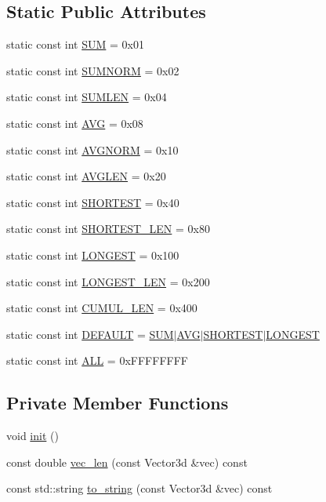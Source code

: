 \subsection*{Static Public Attributes}
\begin{CompactItemize}
\item 
static const int \hyperlink{class_vec_set_stats_d40b4c031735e61869d380bec761041a}{SUM} = 0x01
\item 
static const int \hyperlink{class_vec_set_stats_5c6b167522f05f04d0357f9c525404ed}{SUMNORM} = 0x02
\item 
static const int \hyperlink{class_vec_set_stats_1a5991a18254611aec6ea124f916b650}{SUMLEN} = 0x04
\item 
static const int \hyperlink{class_vec_set_stats_8d4885dfc7b4e4d631e12b1031dabfa8}{AVG} = 0x08
\item 
static const int \hyperlink{class_vec_set_stats_0972452644e7552d3de11d9763f04d13}{AVGNORM} = 0x10
\item 
static const int \hyperlink{class_vec_set_stats_6d85082797085df8918a799163244e20}{AVGLEN} = 0x20
\item 
static const int \hyperlink{class_vec_set_stats_5ec901fadff91737ffd16ca3d89e08f2}{SHORTEST} = 0x40
\item 
static const int \hyperlink{class_vec_set_stats_3023bfabad5006b6dce50482725a2319}{SHORTEST\_\-LEN} = 0x80
\item 
static const int \hyperlink{class_vec_set_stats_0be7215a7373552c5fabd78881735003}{LONGEST} = 0x100
\item 
static const int \hyperlink{class_vec_set_stats_6fcd640961e61b328785f8c030e30181}{LONGEST\_\-LEN} = 0x200
\item 
static const int \hyperlink{class_vec_set_stats_8fe79d213b693917d14bcacd86ff62aa}{CUMUL\_\-LEN} = 0x400
\item 
static const int \hyperlink{class_vec_set_stats_dd7f69167d67da63e03c36f57335c92c}{DEFAULT} = \hyperlink{class_vec_set_stats_d40b4c031735e61869d380bec761041a}{SUM}$|$\hyperlink{class_vec_set_stats_8d4885dfc7b4e4d631e12b1031dabfa8}{AVG}$|$\hyperlink{class_vec_set_stats_5ec901fadff91737ffd16ca3d89e08f2}{SHORTEST}$|$\hyperlink{class_vec_set_stats_0be7215a7373552c5fabd78881735003}{LONGEST}
\item 
static const int \hyperlink{class_vec_set_stats_b56c7865a2064a85a8e46d6add9bda9f}{ALL} = 0xFFFFFFFF
\end{CompactItemize}
\subsection*{Private Member Functions}
\begin{CompactItemize}
\item 
void \hyperlink{class_vec_set_stats_37fbc88237b5eb4d2ec81656bbf2ecc1}{init} ()
\item 
const double \hyperlink{class_vec_set_stats_e33f29edbe292df8f90a7baed6875d4c}{vec\_\-len} (const Vector3d \&vec) const 
\item 
const std::string \hyperlink{class_vec_set_stats_65b3c5457a2fe6b5fa784263356ab8ac}{to\_\-string} (const Vector3d \&vec) const 
\end{CompactItemize}
